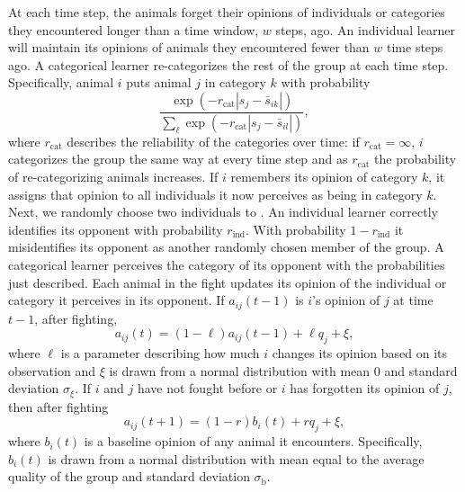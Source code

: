 At each time step, the animals forget their opinions of individuals or categories they encountered longer than a time window, $w$ steps, ago. An individual learner will maintain its opinions of animals they encountered fewer than $w$ time steps ago. A categorical learner re-categorizes the rest of the group at each time step. Specifically, animal $i$ puts animal $j$ in category $k$ with probability 
\begin{equation*}
\frac{\exp(-r_\text{cat}|s_j-\bar{s}_{ik}|)}{\sum_\ell\exp(-r_\text{cat}|s_j-\bar{s}_{il}|)},
\end{equation*}
where $r_\text{cat}$ describes the reliability of the categories over time: if $r_\text{cat}=\infty$, $i$ categorizes the group the same way at every time step and as $r_\text{cat}$ the probability of re-categorizing animals increases. If $i$ remembers its opinion of category $k$, it assigns that opinion to all individuals it now perceives as being in category $k$. 
Next, we randomly choose two individuals to . 
An individual learner correctly identifies its opponent with probability $r_\text{ind}$. With probability $1-r_\text{ind}$ it misidentifies its opponent as another randomly chosen member of the group.  A categorical learner perceives the category of its opponent with the probabilities just described. Each animal in the fight updates its opinion of the individual or category it perceives in its opponent. If $a_{ij}(t-1)$ is $i$'s opinion of $j$ at time $t-1$, after fighting, 
\begin{equation*}
a_{ij}(t)=(1-\ell)a_{ij}(t-1)+\ell q_j+\xi,
\end{equation*}
where $\ell$ is a parameter describing how much $i$ changes its opinion based on its observation and $\xi$ is drawn from a normal distribution with mean $0$ and standard deviation $\sigma_\xi$. If $i$ and $j$ have not fought before or $i$ has forgotten its opinion of $j$, then after fighting 
\begin{equation*}
a_{ij}(t+1)=(1-r)b_{i}(t)+rq_j+\xi,
\end{equation*}
where $b_i(t)$ is a baseline opinion of any animal it encounters. Specifically, $b_i(t)$ is drawn from a normal distribution with mean equal to the average quality of the group and standard deviation $\sigma_\text{b}$. 

